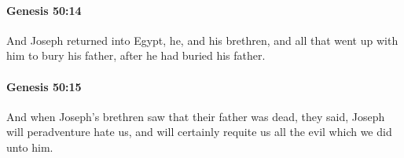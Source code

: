 		\paragraph{Genesis 50:14} %
			\label{GENESIS-50-14}

			And Joseph returned into Egypt, he, and his brethren, and all that went up with him to bury his father, after he had buried his father.


		\paragraph{Genesis 50:15} %
			\label{GENESIS-50-15}

			And when Joseph’s brethren saw that their father was dead, they said, Joseph will peradventure hate us, and will certainly requite us all the evil which we did unto him.

